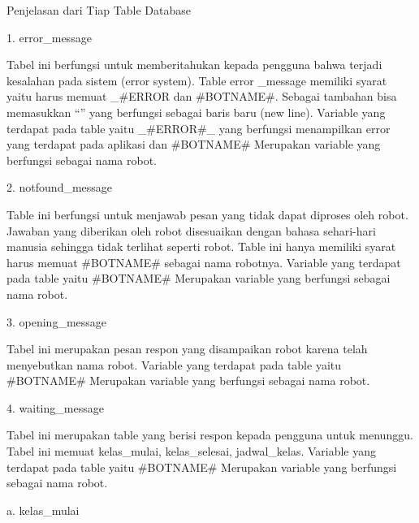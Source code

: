 \documentclass{article}
\begin{document}
    \item Penjelasan dari Tiap Table Database
    \newline
        \item 1. error_message
            \newline
            \par Tabel ini berfungsi untuk memberitahukan kepada pengguna bahwa terjadi kesalahan pada sistem (error system). Table error _message memiliki syarat yaitu harus memuat _#ERROR dan #BOTNAME#. Sebagai tambahan bisa memasukkan “\n” yang berfungsi sebagai baris baru (new line). Variable yang terdapat pada table yaitu _#ERROR#_ yang berfungsi menampilkan error yang terdapat pada aplikasi dan #BOTNAME# Merupakan variable yang berfungsi sebagai nama robot.
            \newline
        \item 2. notfound\_message
            \newline
            \par Table ini berfungsi untuk menjawab pesan yang tidak dapat diproses oleh robot. Jawaban yang diberikan oleh robot disesuaikan dengan bahasa sehari-hari manusia sehingga tidak terlihat seperti robot. Table ini hanya memiliki syarat harus memuat #BOTNAME# sebagai nama robotnya. Variable yang terdapat pada table yaitu #BOTNAME# Merupakan variable yang berfungsi sebagai nama robot.
            \newline
        \item 3. opening\_message
            \newline
            \par Tabel  ini merupakan pesan respon  yang disampaikan robot karena telah menyebutkan nama robot. Variable yang terdapat pada table yaitu #BOTNAME# Merupakan variable yang berfungsi sebagai nama robot.
            \newline
        \item 4. waiting\_message
            \newline
            \par Tabel ini merupakan table yang berisi respon kepada pengguna untuk menunggu. Tabel ini memuat kelas_mulai, kelas_selesai, jadwal_kelas. Variable yang terdapat pada table yaitu #BOTNAME# Merupakan variable yang berfungsi sebagai nama robot.
            \newline
            \newline
        \item a. kelas\_mulai
            \newline
\end{document}
